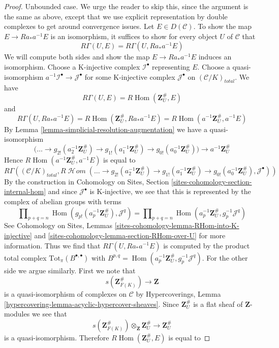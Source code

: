 \documentclass[10pt,a4paper]{amsart}
\theoremstyle{plain}
\theoremstyle{definition}
\theoremstyle{remark}
\numberwithin{equation}{subsection}
\def\Hom{\mathop{\mathrm{Hom}}\nolimits}
\def\SheafHom{\mathop{\mathcal{H}\!\mathit{om}}\nolimits}
\begin{document}
\begin{proof}
\medskip\noindent
Unbounded case. We urge the reader to skip this, since the argument
is the same as above, except that we use explicit representation
by double complexes to get around convergence issues.
Let $E \in D(\mathcal{C})$.
To show the map $E \to Ra_*a^{-1}E$ is an isomorphism,
it suffices to show for every object $U$ of $\mathcal{C}$ that
$$
R\Gamma(U, E) = R\Gamma(U, Ra_*a^{-1}E)
$$
We will compute both sides and show the map $E \to Ra_*a^{-1}E$
induces an isomorphism. Choose a K-injective
complex $\mathcal{I}^\bullet$ representing $E$. Choose a quasi-isomorphism
$a^{-1}\mathcal{I}^\bullet \to \mathcal{J}^\bullet$
for some K-injective complex $\mathcal{J}^\bullet$ on
$(\mathcal{C}/K)_{total}$. We have
$$
R\Gamma(U, E) = R\Hom(\mathbf{Z}_U^\#, E)
$$
and
$$
R\Gamma(U, Ra_*a^{-1}E) = R\Hom(\mathbf{Z}_U^\#, Ra_*a^{-1}E) =
R\Hom(a^{-1}\mathbf{Z}_U^\#, a^{-1}E)
$$
By Lemma \ref{lemma-simplicial-resolution-augmentation}
we have a quasi-isomorphism
$$
\Big(\ldots \to
g_{2!}(a_2^{-1}\mathbf{Z}_U^\#) \to
g_{1!}(a_1^{-1}\mathbf{Z}_U^\#) \to
g_{0!}(a_0^{-1}\mathbf{Z}_U^\#)\Big)
\longrightarrow
a^{-1}\mathbf{Z}_U^\#
$$
Hence $R\Hom(a^{-1}\mathbf{Z}_U^\#, a^{-1}E)$ is equal to
$$
R\Gamma((\mathcal{C}/K)_{total},
R\SheafHom(
\ldots \to
g_{2!}(a_2^{-1}\mathbf{Z}_U^\#) \to
g_{1!}(a_1^{-1}\mathbf{Z}_U^\#) \to
g_{0!}(a_0^{-1}\mathbf{Z}_U^\#),
\mathcal{J}^\bullet))
$$
By the construction in Cohomology on Sites, Section
\ref{sites-cohomology-section-internal-hom}
and since $\mathcal{J}^\bullet$ is K-injective, we see that
this is represented by the complex of abelian groups with terms
$$
\prod\nolimits_{p + q = n}
\Hom(g_{p!}(a_p^{-1}\mathbf{Z}_U^\#), \mathcal{J}^q) =
\prod\nolimits_{p + q = n}
\Hom(a_p^{-1}\mathbf{Z}_U^\#, g_p^{-1}\mathcal{J}^q)
$$
See Cohomology on Sites, Lemmas
\ref{sites-cohomology-lemma-RHom-into-K-injective} and
\ref{sites-cohomology-lemma-section-RHom-over-U} for more information.
Thus we find that $R\Gamma(U, Ra_*a^{-1}E)$ is computed by
the product total complex $\text{Tot}_\pi(B^{\bullet, \bullet})$
with $B^{p, q} = \Hom(a_p^{-1}\mathbf{Z}_U^\#, g_p^{-1}\mathcal{J}^q)$.
For the other side we argue similarly. First we note that
$$
s(\mathbf{Z}_{F(K)}^\#) \longrightarrow \mathbf{Z}
$$
is a quasi-isomorphism of complexes on $\mathcal{C}$
by Hypercoverings, Lemma \ref{hypercovering-lemma-acyclic-hypercover-sheaves}.
Since $\mathbf{Z}_U^\#$ is a flat sheaf of $\mathbf{Z}$-modules
we see that
$$
s(\mathbf{Z}_{F(K)}^\#) \otimes_\mathbf{Z} \mathbf{Z}_U^\#
\longrightarrow
\mathbf{Z}_U^\#
$$
is a quasi-isomorphism. Therefore
$R\Hom(\mathbf{Z}_U^\#, E)$ is equal to

\end{proof}
\end{document}
